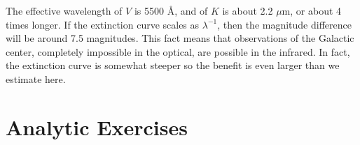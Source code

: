 \begin{enumerate}
\begin{answer}
The effective wavelength of $V$ is 5500 {\AA}, and of $K$ is about 2.2
  $\mu$m, or about 4 times longer. If the extinction curve scales as
  $\lambda^{-1}$, then the magnitude difference will be around 7.5
  magnitudes. This fact means that observations of the Galactic
  center, completely impossible in the optical, are possible in the
  infrared.  In fact, the extinction curve is somewhat steeper so the
  benefit is even larger than we estimate here.
\end{answer}

\end{enumerate}   

\section{Analytic Exercises}

